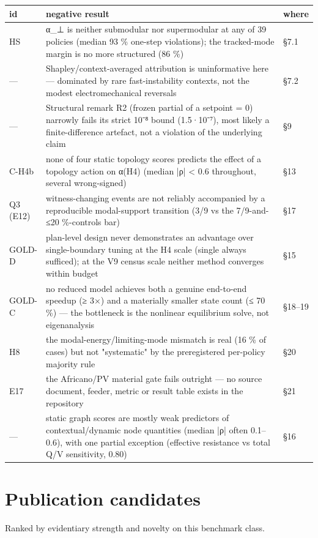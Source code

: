 \documentclass[10pt,a4paper]{article}
\begin{document}
{\small
\begin{longtable}{L{0.060\linewidth}L{0.876\linewidth}L{0.060\linewidth}}
\toprule
\textbf{id} & \textbf{negative result} & \textbf{where} \\
\midrule
\endhead
HS & α\_⊥ is neither submodular nor supermodular at any of 39 policies (median 93 \% one-step violations); the tracked-mode margin is no more structured (86 \%) & §7.1 \\
— & Shapley/context-averaged attribution is uninformative here — dominated by rare fast-instability contexts, not the modest electromechanical reversals & §7.2 \\
— & Structural remark R2 (frozen partial of a setpoint = 0) narrowly fails its strict 10⁻⁸ bound (1.5·10⁻⁷), most likely a finite-difference artefact, not a violation of the underlying claim & §9 \\
C-H4b & none of four static topology scores predicts the effect of a topology action on α(H4) (median |ρ| < 0.6 throughout, several wrong-signed) & §13 \\
Q3 (E12) & witness-changing events are not reliably accompanied by a reproducible modal-support transition (3/9 vs the 7/9-and-≤20 \%-controls bar) & §17 \\
GOLD-D & plan-level design never demonstrates an advantage over single-boundary tuning at the H4 scale (single always sufficed); at the V9 census scale neither method converges within budget & §15 \\
GOLD-C & no reduced model achieves both a genuine end-to-end speedup (≥ 3×) and a materially smaller state count (≤ 70 \%) — the bottleneck is the nonlinear equilibrium solve, not eigenanalysis & §18–19 \\
H8 & the modal-energy/limiting-mode mismatch is real (16 \% of cases) but not "systematic" by the preregistered per-policy majority rule & §20 \\
E17 & the Africano/PV material gate fails outright — no source document, feeder, metric or result table exists in the repository & §21 \\
— & static graph scores are mostly weak predictors of contextual/dynamic node quantities (median |ρ| often 0.1–0.6), with one partial exception (effective resistance vs total Q/V sensitivity, 0.80) & §16 \\
\bottomrule
\end{longtable}}
\section{Publication candidates}
Ranked by evidentiary strength and novelty on this benchmark class.
\end{document}

